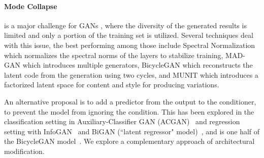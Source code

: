 \paragraph{Mode Collapse} is a major challenge for GANs \cite{goodfellow2014generative}, where the diversity of the generated results is limited and only a portion of the training set is utilized. 
Several techniques deal with this issue, the best performing among those include Spectral Normalization \cite{zhang2018self,miyato2018spectral} which normalizes the spectral norms of the layers to stabilize training, MAD-GAN \cite{ghosh2017multi} which introduces multiple generators, BicycleGAN \cite{zhu2017toward} which reconstructs the latent code from the generation using two cycles, and MUNIT \cite{huang2018multimodal} which introduces a factorized latent space for content and style for producing variations.

An alternative proposal is to add a predictor from the output to the conditioner, to prevent the model from ignoring the condition. This has been explored in the classification setting in Auxiliary-Classifier GAN (ACGAN)~\cite{odena2016conditional} and regression setting with InfoGAN~\cite{chen2016infogan} and BiGAN (``latent regressor" model)~\cite{dumoulin2016adversarially,donahue2016adversarial}, and is one half of the BicycleGAN model~\cite{zhu2017toward}. We explore a complementary approach of architectural modification.




